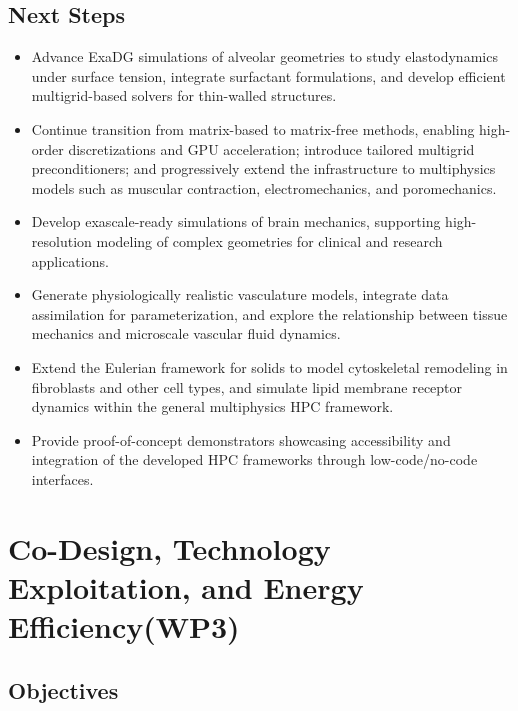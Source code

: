 \documentclass[a4paper,12pt, numbers]{article}
\begin{document}
\subsection{Next Steps} %
\begin{itemize}[left=1em, itemsep=0pt, topsep=0pt]
\item Advance ExaDG simulations of alveolar geometries to study elastodynamics under surface tension, integrate surfactant formulations, and develop efficient multigrid-based solvers for thin-walled structures.

\item Continue transition from matrix-based to matrix-free methods, enabling high-order discretizations and GPU acceleration; introduce tailored multigrid preconditioners; and progressively extend the infrastructure to multiphysics models such as muscular contraction, electromechanics, and poromechanics.

\item Develop exascale-ready simulations of brain mechanics, supporting high-resolution modeling of complex geometries for clinical and research applications.

\item Generate physiologically realistic vasculature models, integrate data assimilation for parameterization, and explore the relationship between tissue mechanics and microscale vascular fluid dynamics.

\item Extend the Eulerian framework for solids to model cytoskeletal remodeling in fibroblasts and other cell types, and simulate lipid membrane receptor dynamics within the general multiphysics HPC framework.

\item Provide proof-of-concept demonstrators showcasing accessibility and integration of the developed HPC frameworks through low-code/no-code interfaces.
\end{itemize}


\newpage

\section{{Co-Design, Technology Exploitation, and Energy Efficiency(WP3)}}
\label{sec:wp3_codesign}

\subsection{Objectives}
\end{document}
